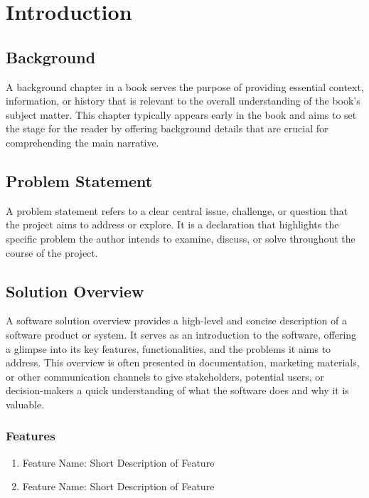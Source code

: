 \chapter{Introduction}
\label{chap:introduction}

\section{Background}
\label{section:background}

A background chapter in a book serves the purpose of providing essential context, information, or history that is relevant
to the overall understanding of the book's subject matter. This chapter typically appears early in the book and aims to set the
stage for the reader by offering background details that are crucial for comprehending the main narrative.

\section{Problem Statement}
\label{section:problem-statement}

A problem statement refers to a clear central issue,
challenge, or question that the project aims to address or explore. It is a
declaration that highlights the specific problem the author intends to examine,
discuss, or solve throughout the course of the project.

\section{Solution Overview}
\label{section:solution-overview}

A software solution overview provides a high-level and
concise description of a software product or system. It serves as an
introduction to the software, offering a glimpse into its key features,
functionalities, and the problems it aims to address. This overview is often
presented in documentation, marketing materials, or other communication
channels to give stakeholders, potential users, or decision-makers a quick
understanding of what the software does and why it is valuable.

\subsection{Features}
\label{subsection:features}

\begin{enumerate}[leftmargin=80pt]
    \item Feature Name: Short Description of Feature
    \item Feature Name: Short Description of Feature
\end{enumerate}

